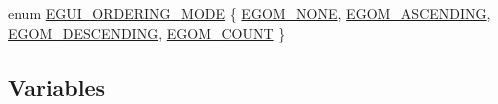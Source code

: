 \begin{DoxyCompactItemize}
\item 
enum \hyperlink{namespaceirr_1_1gui_a577bf3aa30c2e3bde9aa3eaa2e4f16d3}{E\+G\+U\+I\+\_\+\+O\+R\+D\+E\+R\+I\+N\+G\+\_\+\+M\+O\+DE} \{ \hyperlink{namespaceirr_1_1gui_a577bf3aa30c2e3bde9aa3eaa2e4f16d3a4663b40ac164a811834112141af86961}{E\+G\+O\+M\+\_\+\+N\+O\+NE}, 
\hyperlink{namespaceirr_1_1gui_a577bf3aa30c2e3bde9aa3eaa2e4f16d3ae68aff56778cbbd1fb5b34e425b7c129}{E\+G\+O\+M\+\_\+\+A\+S\+C\+E\+N\+D\+I\+NG}, 
\hyperlink{namespaceirr_1_1gui_a577bf3aa30c2e3bde9aa3eaa2e4f16d3ad1b031c00861395b5350ebcca36425b5}{E\+G\+O\+M\+\_\+\+D\+E\+S\+C\+E\+N\+D\+I\+NG}, 
\hyperlink{namespaceirr_1_1gui_a577bf3aa30c2e3bde9aa3eaa2e4f16d3a7bba14d09950eea8d3a5e411b0b6498f}{E\+G\+O\+M\+\_\+\+C\+O\+U\+NT}
 \}
\end{DoxyCompactItemize}
\subsection*{Variables}
